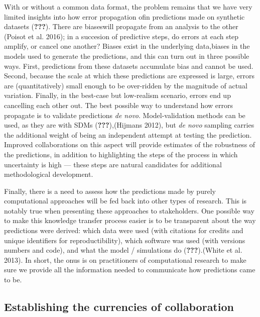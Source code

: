 \documentclass[11pt,serif]{article}
\begin{document}
With or without a common data format, the problem remains that we have
very limited insights into \color{purple}how\color{black} error
\color{gray}propagation of\color{black}\color{purple}in\color{black}
predictions made on synthetic datasets \color{gray}({\textbf{???}}).
There are biases\color{black}\color{purple}will\color{black}
\color{purple}propagate from an analysis to the other (Poisot et al.
2016); in a succesion of\color{black} \color{purple}predictive steps, do
errors at each step amplify, or cancel one another? Biases\color{black}
\color{purple}exist\color{black} in the underlying
data,\color{gray}biases\color{black} in the models used to generate the
predictions, and this can turn out in three possible ways. First,
predictions from these datasets accumulate bias and cannot be used.
Second, because the scale at which these predictions are expressed is
large, errors are (quantitatively) small enough to be over-ridden by the
magnitude of actual variation. Finally, in the best-case but low-realism
scenario, errors end up cancelling each other out. The best possible way
to understand how errors propagate is to validate predictions \emph{de
novo}. Model-validation methods can be used, as they are with SDMs
\color{gray}({\textbf{???}}),\color{black}\color{purple}(Hijmans
2012),\color{black} but \emph{de novo} sampling carries the additional
weight of being an independent attempt at testing the prediction.
Improved collaborations on this aspect will provide estimates of the
robustness of the predictions, in addition to highlighting the steps of
the process in which uncertainty is high --- these steps are natural
candidates for additional methodological development.

Finally, there is a need to assess how the predictions made by purely
computational approaches will be fed back into other types of research.
This is notably true when presenting these approaches to stakeholders.
One possible way to make this knowledge transfer process easier is to be
transparent about the way predictions were derived: which data were used
(with citations for credits and unique identifiers for
reproductibility), which software was used (with versions numbers and
code), and what the model / simulations do
\color{gray}({\textbf{???}}).\color{black}\color{purple}(White et al.
2013).\color{black} In short, the onus is on practitioners of
computational research to make sure we provide all the information
needed to communicate how predictions came to be.

\subsection{Establishing the currencies of
collaboration}\label{establishing-the-currencies-of-collaboration}
\end{document}
